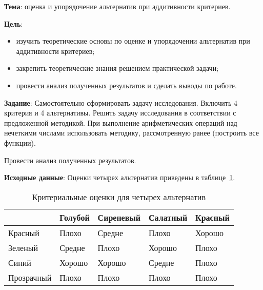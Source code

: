 


\newcommand{\labnumber}{6} %



\usepackage{systeme}
\usepackage{longtable,tabu}
\usepackage{multirow}
\usepackage{array,multirow}
\usepackage{pdflscape}
\usepackage{afterpage}
\usepackage{tikz}
\usepackage{bm}
\usepackage{qtree}

\graphicspath{{figures/}}


\Russian


\addtocounter{page}{1}

\textbf{Тема}: оценка и упорядочение альтернатив при аддитивности критериев.

\textbf{Цель}: 
\begin{itemize}
	\item изучить теоретические основы по оценке и упорядочении альтернатив при аддитивности критериев;
	\item закрепить теоретические знания решением практической задачи;
	\item провести анализ полученных результатов и сделать выводы по работе.
\end{itemize}

\textbf{Задание}: 
Самостоятельно сформировать задачу исследования. Включить 4 критерия и 4 альтернативы. Решить задачу исследования в соответствии с предложенной методикой. При выполнение арифметических операций над нечеткими числами использовать методику, рассмотренную ранее (построить все функции).

Провести анализ полученных результатов.

\textbf{Исходные данные}: 
Оценки четырех альтернатив приведены в таблице~\ref{tab:source}.

\begin{table}[H]
	\caption{Критериальные оценки для четырех альтернатив}
	\label{tab:source}
	\begin{tabular}{l|llll}
		           & Голубой & Сиреневый & Салатный & Красный \\\hline
		Красный    & Плохо & Средне & Плохо & Хорошо \\
		Зеленый    & Средне & Плохо & Хорошо & Плохо \\
		Синий      & Хорошо & Хорошо & Средне & Плохо \\
		Прозрачный & Плохо & Плохо & Плохо & Плохо \\
	\end{tabular}
\end{table}

